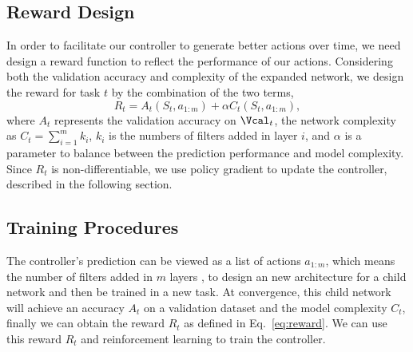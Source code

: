 \documentclass{article}
\begin{document}
\subsection{Reward Design}
\label{sec:reward}
In order to facilitate  our controller to generate better actions over time, we need design a reward function to reflect the performance of our actions.  Considering both the validation accuracy and complexity of the expanded network, we design the reward for task $t$ by the combination of the two terms, 
\begin{equation}
R_t = A_t(S_t,a_{1:m})  + \alpha C_t(S_t,a_{1:m}), \label{eq:reward}
\end{equation}
where $A_t$ represents the validation accuracy on $\Vcal_t$, the network complexity as $C_t = \sum\limits_{i=1}^m k_i$, $k_i$ is the numbers of filters added in layer $i$, and $\alpha$ is a parameter to balance between the prediction performance and model complexity.  
Since $R_t$ is non-differentiable, we use policy gradient to update the controller, described in the following section.

\subsection{Training Procedures} 

The controller's prediction can be viewed as a list of actions $a_{1:m}$, which means the number of filters added in $m$ layers , to design an
new architecture for a child network and then be trained in a new task. At convergence, this child network will achieve an accuracy $A_t$ on
a validation dataset and the model complexity $C_t$, finally we can obtain the reward $R_t$ as defined in Eq.~\eqref{eq:reward}. We can use this reward $R_t$ and reinforcement learning
to train the controller. 
\end{document}
